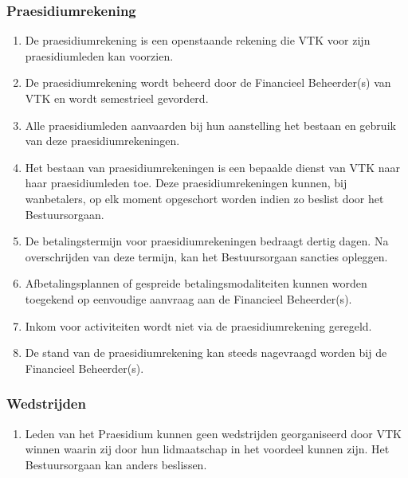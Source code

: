     \subsubsection{Praesidiumrekening}
    \begin{enumerate}
    \item De praesidiumrekening is een openstaande rekening die VTK voor zijn praesidiumleden kan voorzien.
    \item De praesidiumrekening wordt beheerd door de Financieel Beheerder(s) van VTK en wordt semestrieel gevorderd. 
    \item Alle praesidiumleden aanvaarden bij hun aanstelling het bestaan en gebruik van deze praesidiumrekeningen.
    \item Het bestaan van praesidiumrekeningen is een bepaalde dienst van VTK naar haar praesidiumleden toe. Deze praesidiumrekeningen kunnen, bij wanbetalers, op elk moment opgeschort worden indien zo beslist door het Bestuursorgaan.
    \item De betalingstermijn voor praesidiumrekeningen bedraagt dertig dagen. Na overschrijden van deze termijn, kan het Bestuursorgaan sancties opleggen.
    \item Afbetalingsplannen of gespreide betalingsmodaliteiten kunnen worden toegekend op eenvoudige aanvraag aan de Financieel Beheerder(s).
    \item Inkom voor activiteiten wordt niet via de praesidiumrekening geregeld.
    \item De stand van de praesidiumrekening kan steeds nagevraagd worden bij de Financieel Beheerder(s).
    \end{enumerate}
    
    \subsubsection{Wedstrijden}\label{art:praesidium-wedstrijden}
    \begin{enumerate}
    \item Leden van het Praesidium kunnen geen wedstrijden georganiseerd door VTK winnen waarin zij door hun lidmaatschap in het voordeel kunnen zijn. Het Bestuursorgaan kan anders beslissen.
    \end{enumerate}
    
